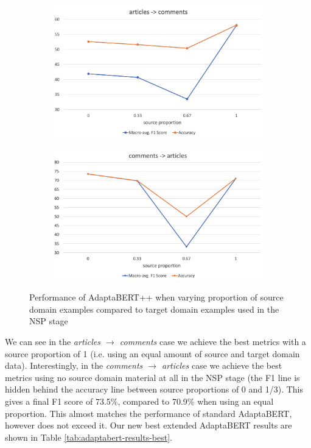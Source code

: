 \begin{figure}[ht]
    \centering
    \begin{subfigure}{\textwidth}
        \centering
        \includegraphics[scale=0.24]{0-img/nsp-src-proportion-articles-comments.png}
    \end{subfigure}
    \begin{subfigure}{\textwidth}
        \centering
        \includegraphics[scale=0.24]{0-img/nsp-src-proportion-comments-articles.png}
    \end{subfigure}
    \caption{Performance of AdaptaBERT++ when varying proportion of source domain examples compared to target domain examples used in the NSP stage}
    \label{fig:ner-src-proportion}
\end{figure}

We can see in the \textit{articles $ \rightarrow $ comments} case we achieve the best metrics with a source proportion of 1 (i.e. using an equal amount of source and target domain data). Interestingly, in the \textit{comments $ \rightarrow $ articles} case we achieve the best metrics using no source domain material at all in the NSP stage (the F1 line is hidden behind the accuracy line between source proportions of 0 and 1/3). This gives a final F1 score of 73.5\%, compared to 70.9\% when using an equal proportion. This almost matches the performance of standard AdaptaBERT, however does not exceed it. Our new best extended AdaptaBERT results are shown in Table \ref{tab:adaptabert-results-best}.

